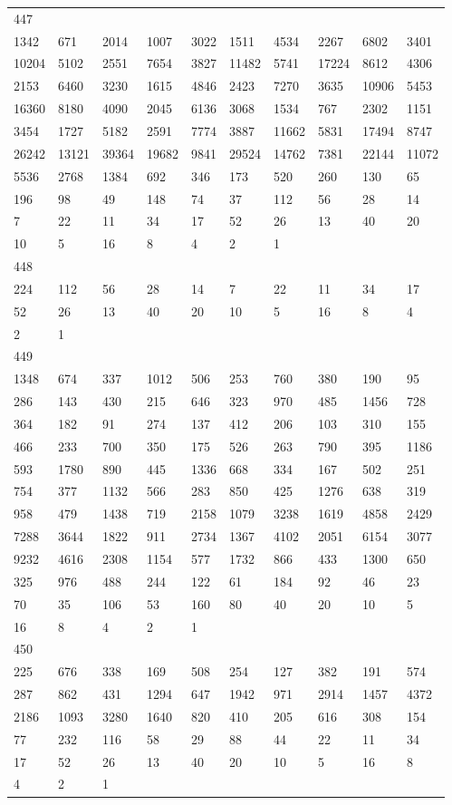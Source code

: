 \begin{longtable}{*{10}{l}}
447&&&&&&&&&\\
1342& 671& 2014& 1007& 3022& 1511& 4534& 2267& 6802& 3401\\
10204& 5102& 2551& 7654& 3827& 11482& 5741& 17224& 8612& 4306\\
2153& 6460& 3230& 1615& 4846& 2423& 7270& 3635& 10906& 5453\\
16360& 8180& 4090& 2045& 6136& 3068& 1534& 767& 2302& 1151\\
3454& 1727& 5182& 2591& 7774& 3887& 11662& 5831& 17494& 8747\\
26242& 13121& 39364& 19682& 9841& 29524& 14762& 7381& 22144& 11072\\
5536& 2768& 1384& 692& 346& 173& 520& 260& 130& 65\\
196& 98& 49& 148& 74& 37& 112& 56& 28& 14\\
7& 22& 11& 34& 17& 52& 26& 13& 40& 20\\
10& 5& 16& 8& 4& 2& 1& \\

448&&&&&&&&&\\
224& 112& 56& 28& 14& 7& 22& 11& 34& 17\\
52& 26& 13& 40& 20& 10& 5& 16& 8& 4\\
2& 1& \\

449&&&&&&&&&\\
1348& 674& 337& 1012& 506& 253& 760& 380& 190& 95\\
286& 143& 430& 215& 646& 323& 970& 485& 1456& 728\\
364& 182& 91& 274& 137& 412& 206& 103& 310& 155\\
466& 233& 700& 350& 175& 526& 263& 790& 395& 1186\\
593& 1780& 890& 445& 1336& 668& 334& 167& 502& 251\\
754& 377& 1132& 566& 283& 850& 425& 1276& 638& 319\\
958& 479& 1438& 719& 2158& 1079& 3238& 1619& 4858& 2429\\
7288& 3644& 1822& 911& 2734& 1367& 4102& 2051& 6154& 3077\\
9232& 4616& 2308& 1154& 577& 1732& 866& 433& 1300& 650\\
325& 976& 488& 244& 122& 61& 184& 92& 46& 23\\
70& 35& 106& 53& 160& 80& 40& 20& 10& 5\\
16& 8& 4& 2& 1& \\

450&&&&&&&&&\\
225& 676& 338& 169& 508& 254& 127& 382& 191& 574\\
287& 862& 431& 1294& 647& 1942& 971& 2914& 1457& 4372\\
2186& 1093& 3280& 1640& 820& 410& 205& 616& 308& 154\\
77& 232& 116& 58& 29& 88& 44& 22& 11& 34\\
17& 52& 26& 13& 40& 20& 10& 5& 16& 8\\
4& 2& 1& \\


\end{longtable}
